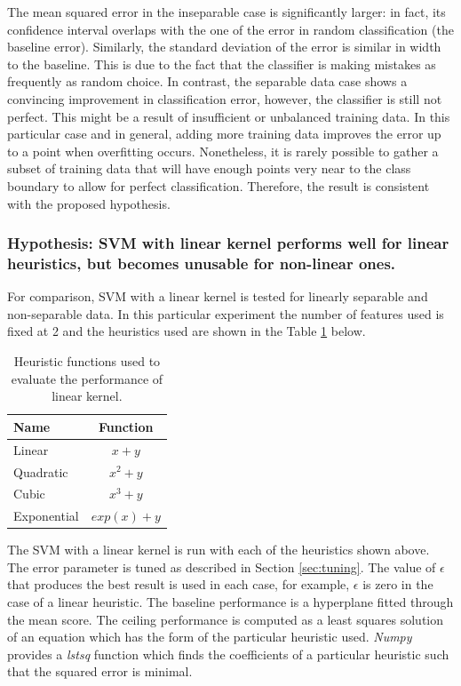 \documentclass[12pt,notitlepage,twoside]{scrreprt}
\begin{document}
The mean squared error in the inseparable case is significantly larger: in fact, its
confidence interval overlaps with the one of the error in random classification (the
baseline error). Similarly, the standard deviation of the error is similar in width to the
baseline. This is due to the fact that the classifier is making mistakes as frequently as random choice. In
contrast, the separable data case shows a convincing improvement in classification error,
however, the classifier is still not perfect. This might be a result of insufficient
or unbalanced training data. In this particular case and in general, adding more training
data improves the error up to a point when overfitting occurs. Nonetheless, it is rarely
possible to gather a subset of training data that will have enough points very near to the class
boundary to allow for perfect classification. Therefore, the result is consistent with the
proposed hypothesis.
\subsubsection*{Hypothesis: SVM with linear kernel performs well for linear heuristics, but becomes
unusable for non-linear ones.}


For comparison, SVM with a linear kernel is tested for linearly separable and
non-separable data. In this particular experiment the number of features used is fixed at
2 and the heuristics used are shown in the Table \ref{linkern} below. 

\begin{table}[h!]
	\centering
	\begin{tabular}[h!]{l|c}
		\hline
		Name & Function \\ \hline
		Linear & \(x+y\)\\ \hline
		Quadratic & \(x^2+y\)\\ \hline
		Cubic & \(x^3+y\)\\ \hline
		Exponential & \(exp(x)+y\)\\ \hline
	\end{tabular}
	\caption{Heuristic functions used to evaluate the performance of linear kernel.
		\label{linkern}}
\end{table}

The SVM with a linear kernel is run with each of the heuristics shown above. The error
parameter is tuned as described in Section \ref{sec:tuning}. The value of $\epsilon$ that produces
the best result is used in each case, for example, $\epsilon$ is zero in the
case of a linear heuristic. The baseline performance is a hyperplane fitted through the
mean score. The ceiling performance is computed as a least squares solution of an equation
which has the form of the particular heuristic used. \textit{Numpy} provides a
\textit{lstsq} function which finds the coefficients of a particular heuristic such that
the squared error is minimal.
\end{document}
